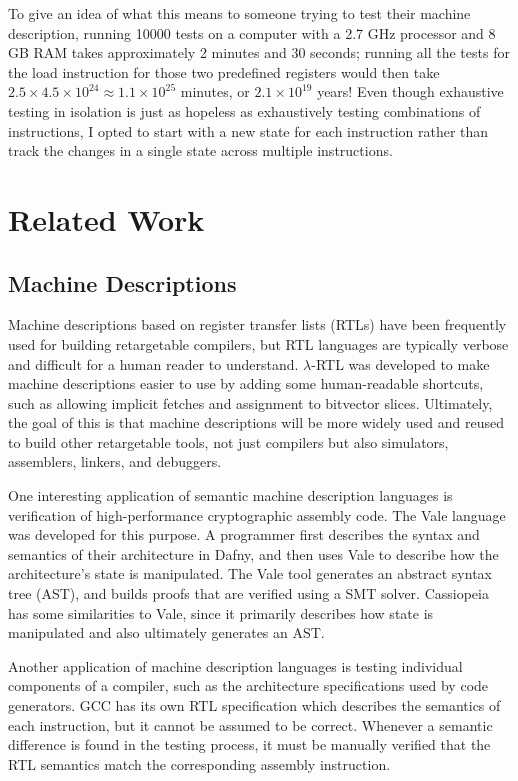 \documentclass[letterpaper,12pt]{article}
\begin{document}
To give an idea of what this means to someone trying to test their machine description, running 10000 tests on a computer with a 2.7 GHz processor and 8 GB RAM takes approximately 2 minutes and 30 seconds; running all the tests for the load instruction for those two predefined registers would then take $2.5 \times 4.5 \times 10^{24} \approx 1.1 \times 10^25$ minutes, or $2.1 \times 10^{19}$ years! Even though exhaustive testing in isolation is just as hopeless as exhaustively testing combinations of instructions, I opted to start with a new state for each instruction rather than track the changes in a single state across multiple instructions.

\section{Related Work}

\subsection{Machine Descriptions}

Machine descriptions based on register transfer lists (RTLs) have been frequently used for building retargetable compilers, but RTL languages are typically verbose and difficult for a human reader to understand. $\lambda$-RTL was developed to make machine descriptions easier to use by adding some human-readable shortcuts, such as allowing implicit fetches and assignment to bitvector slices. Ultimately, the goal of this is that machine descriptions will be more widely used and reused to build other retargetable tools, not just compilers but also simulators, assemblers, linkers, and debuggers\cite{Mdesc}.

One interesting application of semantic machine description languages is verification of high-performance cryptographic assembly code. The Vale language was developed for this purpose. A programmer first describes the syntax and semantics of their architecture in Dafny, and then uses Vale to describe how the architecture's state is manipulated. The Vale tool generates an abstract syntax tree (AST), and builds proofs that are verified using a SMT solver\cite{Vale}. Cassiopeia has some similarities to Vale, since it primarily describes how state is manipulated and also ultimately generates an AST.

Another application of machine description languages is testing individual components of a compiler, such as the architecture specifications used by code generators. GCC has its own RTL specification which describes the semantics of each instruction, but it cannot be assumed to be correct. Whenever a semantic difference is found in the testing process, it must be manually verified that the RTL semantics match the corresponding assembly instruction\cite{Cgo}.
\end{document}
